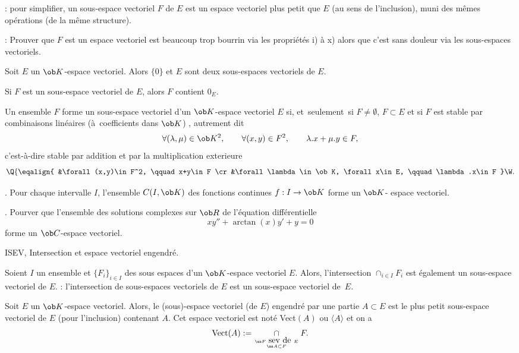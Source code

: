 \Remarque : pour simplifier, un sous-espace vectoriel $F$ de $E$ est un espace vectoriel plus petit que $E$ (au sens de l'inclusion), muni des mêmes opérations (de la même structure). 
\bigskip

\Remarque : Prouver que $F$ est un espace vectoriel est beaucoup trop bourrin via les propriétés i) à x) alors que 
c'est sans douleur via les sous-espaces vectoriels. 
\bigskip

\Propriete []  Soit $E$ un $\ob K$-espace vectoriel. Alors $\{0\}$ et $E$ sont deux sous-espaces vectoriels de $E$. 
\bigskip

\Propriete []  Si $F$ est un sous-espace vectoriel de $E$, alors $F$ contient $0_E$. 
\bigskip


\Propriete []  Un ensemble $F$ forme un sous-espace vectoriel d'un $\ob K$-espace vectoriel $E$ si, et~seulement~si
$F\neq\emptyset$, $F\subset E$ et si $F$ est stable par combinaisons linéaires 
(à~coefficients dans $\ob K$) , autrement dit
$$
\forall (\lambda,\mu)\in\ob K^2 , \qquad  \forall (x,y)\in F^2 ,\qquad \lambda. x+\mu. y\in F, 
$$
c'est-à-dire stable par addition et par la multiplication exterieure
$$
\Q\{\eqalign{
	&\forall (x,y)\in F^2, \qquad x+y\in F
	\cr
	&\forall \lambda\in\ob K, \forall x\in E, \qquad \lambda.x\in F
}\W.
$$

\Exemple. Pour chaque intervalle $I$, l'ensemble $\sc C(I,\ob K)$ des fonctions continues $f:I\to\ob K$ forme un $\ob K$-
espace vectoriel.

 \Exercice. Pourver que l'ensemble des solutions complexes sur $\ob R$ de l'équation différentielle 
$$
x y''+\arctan(x)y'+y=0
$$ 
forme un $\ob C$-espace vectoriel. 
\bigskip

\Subsection ISEV, Intersection et espace vectoriel engendré.
\bigskip

\Propriete []  Soient $I$ un ensemble et $\{F_i\}_{i\in I}$ des sous espaces d'un $\ob K$-espace vectoriel $E$. 
Alors, l'intersection $\cap_{i\in I}F_i$ est également un sous-espace vectoriel de $E$. 
\bigskip
\Remarque : l'intersection de sous-espaces vectoriels de $E$ est un sous-espace vectoriel de~$E$. 
\bigskip


\Definition []  Soit $E$ un $\ob K$-espace vectoriel. 
Alors, le (sous)-espace vectoriel (de $E$) engendré par une partie $A\subset E$ est le plus petit sous-espace vectoriel de $E$ (pour l'inclusion) contenant $A$. 
Cet espace vectoriel est noté Vect$(A)$ ou $\langle A\rangle$ et on a 
$$
\mbox{Vect}(A):=\mathop{\cap}\limits_{\ss F \mbox{ sev de }E\atop\ss A\subset F}F.
$$


